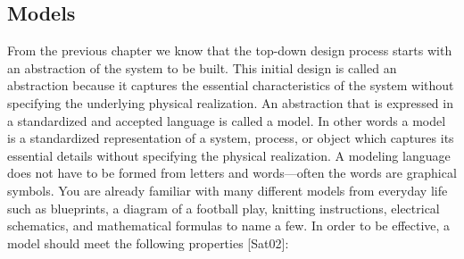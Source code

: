 \subsection{Models}\label{models}

From the previous chapter we know that the top-down design process
starts with an abstraction of the system to be built. This initial
design is called an abstraction because it captures the essential
characteristics of the system without specifying the underlying physical
realization. An abstraction that is expressed in a standardized and
accepted language is called a model. In other words a model is a
standardized representation of a system, process, or object which
captures its essential details without specifying the physical
realization. A modeling language does not have to be formed from letters
and words---often the words are graphical symbols. You are already
familiar with many different models from everyday life such as
blueprints, a diagram of a football play, knitting instructions,
electrical schematics, and mathematical formulas to name a few. In order
to be effective, a model should meet the following properties
{[}Sat02{]}:

